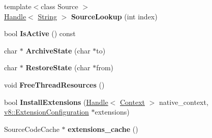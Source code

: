 \begin{DoxyCompactItemize}
\item 
{\footnotesize template$<$class Source $>$ }\\\hyperlink{classv8_1_1internal_1_1_handle}{Handle}$<$ \hyperlink{classv8_1_1internal_1_1_string}{String} $>$ {\bfseries Source\+Lookup} (int index)\hypertarget{classv8_1_1internal_1_1_bootstrapper_ac5978af978e21c44b5759dd4586335d4}{}\label{classv8_1_1internal_1_1_bootstrapper_ac5978af978e21c44b5759dd4586335d4}

\item 
bool {\bfseries Is\+Active} () const \hypertarget{classv8_1_1internal_1_1_bootstrapper_a88b79f587a059d57a6944beedb579ef0}{}\label{classv8_1_1internal_1_1_bootstrapper_a88b79f587a059d57a6944beedb579ef0}

\item 
char $\ast$ {\bfseries Archive\+State} (char $\ast$to)\hypertarget{classv8_1_1internal_1_1_bootstrapper_ae9807d1ed391e6bf63f822622568bdf9}{}\label{classv8_1_1internal_1_1_bootstrapper_ae9807d1ed391e6bf63f822622568bdf9}

\item 
char $\ast$ {\bfseries Restore\+State} (char $\ast$from)\hypertarget{classv8_1_1internal_1_1_bootstrapper_a09e5063ba2fb10e54d55780cbf8dd761}{}\label{classv8_1_1internal_1_1_bootstrapper_a09e5063ba2fb10e54d55780cbf8dd761}

\item 
void {\bfseries Free\+Thread\+Resources} ()\hypertarget{classv8_1_1internal_1_1_bootstrapper_a7a9f0a465b7af7f35684b12bfc16c29d}{}\label{classv8_1_1internal_1_1_bootstrapper_a7a9f0a465b7af7f35684b12bfc16c29d}

\item 
bool {\bfseries Install\+Extensions} (\hyperlink{classv8_1_1internal_1_1_handle}{Handle}$<$ \hyperlink{classv8_1_1internal_1_1_context}{Context} $>$ native\+\_\+context, \hyperlink{classv8_1_1_extension_configuration}{v8\+::\+Extension\+Configuration} $\ast$extensions)\hypertarget{classv8_1_1internal_1_1_bootstrapper_ad7c7e8c0886019b2c032d9d9cde5f835}{}\label{classv8_1_1internal_1_1_bootstrapper_ad7c7e8c0886019b2c032d9d9cde5f835}

\item 
Source\+Code\+Cache $\ast$ {\bfseries extensions\+\_\+cache} ()\hypertarget{classv8_1_1internal_1_1_bootstrapper_a551ccd9e8436e6325522834e16e03b6d}{}\label{classv8_1_1internal_1_1_bootstrapper_a551ccd9e8436e6325522834e16e03b6d}

\end{DoxyCompactItemize}
